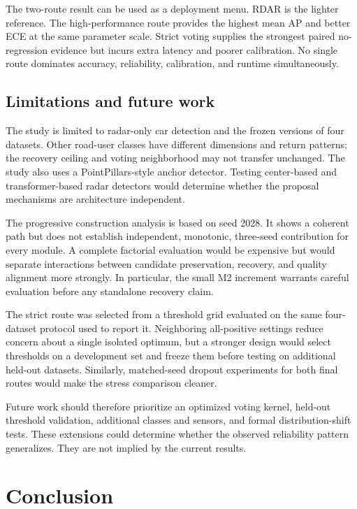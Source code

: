 \documentclass[final,5p,times]{elsarticle}
\begin{document}
The two-route result can be used as a deployment menu. RDAR is the lighter
reference. The high-performance route provides the highest mean AP and better
ECE at the same parameter scale. Strict voting supplies the strongest paired
no-regression evidence but incurs extra latency and poorer calibration. No
single route dominates accuracy, reliability, calibration, and runtime
simultaneously.

\subsection{Limitations and future work}

The study is limited to radar-only car detection and the frozen versions of
four datasets. Other road-user classes have different dimensions and return
patterns; the recovery ceiling and voting neighborhood may not transfer
unchanged. The study also uses a PointPillars-style anchor detector. Testing
center-based and transformer-based radar detectors would determine whether the
proposal mechanisms are architecture independent.

The progressive construction analysis is based on seed 2028. It shows a coherent
path but does not establish independent, monotonic, three-seed contribution
for every module. A complete factorial evaluation would be expensive but would
separate interactions between candidate preservation, recovery, and quality
alignment more strongly. In particular, the small M2 increment warrants
careful evaluation before any standalone recovery claim.

The strict route was selected from a threshold grid evaluated on the same
four-dataset protocol used to report it. Neighboring all-positive settings
reduce concern about a single isolated optimum, but a stronger design would
select thresholds on a development set and freeze them before testing on
additional held-out datasets. Similarly, matched-seed dropout experiments for
both final routes would make the stress comparison cleaner.

Future work should therefore prioritize an optimized voting kernel, held-out
threshold validation, additional classes and sensors, and formal
distribution-shift tests. These extensions could determine whether the
observed reliability pattern generalizes. They are not implied by the current
results.

\section{Conclusion}
\end{document}
